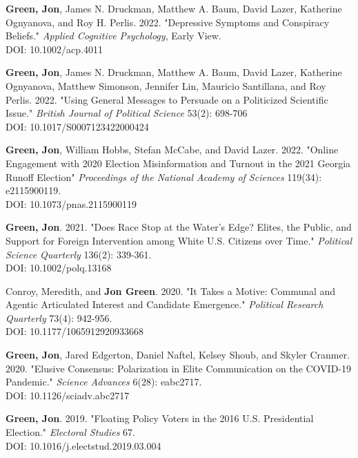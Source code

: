 \documentclass[letterpaper]{article}
\begin{document}
\begin{etaremune}
\item \textbf{Green, Jon}, James N. Druckman, Matthew A. Baum, David Lazer, Katherine Ognyanova, and Roy H. Perlis. 2022. "Depressive Symptoms and Conspiracy Beliefs." \textit{Applied Cognitive Psychology}, Early View. \\
DOI: 10.1002/acp.4011

\item  \textbf{Green, Jon}, James N. Druckman, Matthew A. Baum, David Lazer, Katherine Ognyanova, Matthew Simonson, Jennifer Lin, Mauricio Santillana, and Roy Perlis. 2022. "Using General Messages to Persuade on a Politicized Scientific Issue." \textit{British Journal of Political Science} 53(2): 698-706 \\
DOI: 10.1017/S0007123422000424

\item  \textbf{Green, Jon}, William Hobbs, Stefan McCabe, and David Lazer. 2022. "Online Engagement with 2020 Election Misinformation and Turnout in the 2021 Georgia Runoff Election"  \textit{Proceedings of the National Academy of Sciences} 119(34): e2115900119. \\
DOI: 10.1073/pnas.2115900119

\item \textbf{Green, Jon}. 2021. "Does Race Stop at the Water's Edge? Elites, the Public, and Support for Foreign Intervention among White U.S. Citizens over Time." \textit{Political Science Quarterly} 136(2): 339-361. \\
DOI: 10.1002/polq.13168

\item Conroy, Meredith, and \textbf{Jon Green}. 2020. "It Takes a Motive: Communal and Agentic Articulated Interest and Candidate Emergence."  \textit{Political Research Quarterly} 73(4): 942-956. \\
DOI: 10.1177/1065912920933668

\item \textbf{Green, Jon}, Jared Edgerton, Daniel Naftel, Kelsey Shoub, and Skyler Cranmer. 2020. "Elusive Consensus: Polarization in Elite Communication on the COVID-19 Pandemic." \textit{Science Advances} 6(28): eabc2717. \\
DOI: 10.1126/sciadv.abc2717

\item \textbf{Green, Jon}. 2019. "Floating Policy Voters in the 2016 U.S. Presidential Election." \textit{Electoral Studies} 67. \\
DOI: 10.1016/j.electstud.2019.03.004


\end{etaremune}
\end{document}
